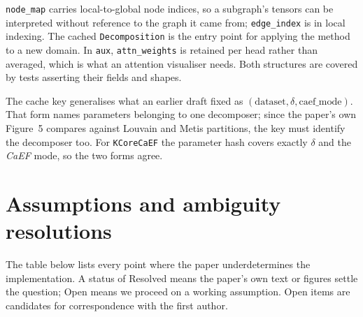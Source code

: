 \documentclass[11pt,a4paper]{article}
\newcommand{\caef}{\textit{CaEF}}
\begin{document}
\noindent
\texttt{node\_map} carries local-to-global node indices, so a subgraph's tensors can be interpreted
without reference to the graph it came from; \texttt{edge\_index} is in local indexing. The cached
\texttt{Decomposition} is the entry point for applying the method to a new domain. In \texttt{aux},
\texttt{attn\_weights} is retained per head rather than averaged, which is what an attention
visualiser needs. Both structures are covered by tests asserting their fields and shapes.

The cache key generalises what an earlier draft fixed as $(\textrm{dataset}, \delta,
\textrm{caef\_mode})$. That form names parameters belonging to one decomposer; since the paper's
own Figure~5 compares against Louvain and Metis partitions, the key must identify the decomposer
too. For \texttt{KCoreCaEF} the parameter hash covers exactly $\delta$ and the \caef{} mode, so the
two forms agree.

\section{Assumptions and ambiguity resolutions}
\label{sec:ambiguity}

The table below lists every point where the paper underdetermines the implementation. A status of
Resolved means the paper's own text or figures settle the question; Open means we proceed on a
working assumption. Open items are candidates for correspondence with the first author.
\end{document}
